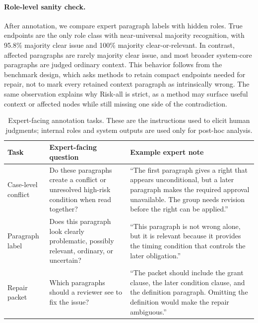 \documentclass[11pt]{article}
\newcommand{\riskall}{Risk-all}
\begin{document}
\paragraph{Role-level sanity check.}
After annotation, we compare expert paragraph labels with hidden roles.  True endpoints are the only role class with near-universal majority recognition, with 95.8\% majority clear issue and 100\% majority clear-or-relevant.  In contrast, affected paragraphs are rarely majority clear issue, and most broader system-core paragraphs are judged ordinary context.  This behavior follows from the benchmark design, which asks methods to retain compact endpoints needed for repair, not to mark every retained context paragraph as intrinsically wrong.  The same observation explains why \riskall{} is strict, as a method may surface useful context or affected nodes while still missing one side of the contradiction.

\begin{table}[t]
\centering
\small
\setlength{\tabcolsep}{4pt}
\begin{tabular}{p{}p{}p{}}
\toprule
Task & Expert-facing question & Example expert note \\
\midrule
Case-level conflict & Do these paragraphs create a conflict or unresolved high-risk condition when read together? & ``The first paragraph gives a right that appears unconditional, but a later paragraph makes the required approval unavailable.  The group needs revision before the right can be applied.'' \\
Paragraph label & Does this paragraph look clearly problematic, possibly relevant, ordinary, or uncertain? & ``This paragraph is not wrong alone, but it is relevant because it provides the timing condition that controls the later obligation.'' \\
Repair packet & Which paragraphs should a reviewer see to fix the issue? & ``The packet should include the grant clause, the later condition clause, and the definition paragraph.  Omitting the definition would make the repair ambiguous.'' \\
\bottomrule
\end{tabular}
\caption{Expert-facing annotation tasks.  These are the instructions used to elicit human judgments; internal roles and system outputs are used only for post-hoc analysis.}
\label{tab:expert_protocol}
\end{table}
\end{document}

